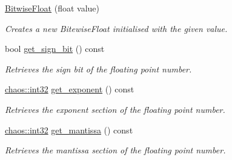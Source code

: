 \begin{DoxyCompactItemize}
\item 
\hypertarget{unionchaos_1_1data_1_1_bitwise_float_a7713ceaaa7cf2a487304088003d94135}{\hyperlink{unionchaos_1_1data_1_1_bitwise_float_a7713ceaaa7cf2a487304088003d94135}{Bitwise\-Float} (float value)}\label{unionchaos_1_1data_1_1_bitwise_float_a7713ceaaa7cf2a487304088003d94135}

\begin{DoxyCompactList}\small\item\em Creates a new Bitewise\-Float initialised with the given value. \end{DoxyCompactList}\item 
\hypertarget{unionchaos_1_1data_1_1_bitwise_float_aec1ad0a94dcf984131cc528b574c7d2d}{bool \hyperlink{unionchaos_1_1data_1_1_bitwise_float_aec1ad0a94dcf984131cc528b574c7d2d}{get\-\_\-sign\-\_\-bit} () const }\label{unionchaos_1_1data_1_1_bitwise_float_aec1ad0a94dcf984131cc528b574c7d2d}

\begin{DoxyCompactList}\small\item\em Retrieves the sign bit of the floating point number. \end{DoxyCompactList}\item 
\hypertarget{unionchaos_1_1data_1_1_bitwise_float_a2ba081eec75c0046f11de70fa08263e3}{\hyperlink{namespacechaos_aba819cd899114dc5873e32e7b26411c4}{chaos\-::int32} \hyperlink{unionchaos_1_1data_1_1_bitwise_float_a2ba081eec75c0046f11de70fa08263e3}{get\-\_\-exponent} () const }\label{unionchaos_1_1data_1_1_bitwise_float_a2ba081eec75c0046f11de70fa08263e3}

\begin{DoxyCompactList}\small\item\em Retrieves the exponent section of the floating point number. \end{DoxyCompactList}\item 
\hypertarget{unionchaos_1_1data_1_1_bitwise_float_a5de1db534ca075097f3796e215485d9a}{\hyperlink{namespacechaos_aba819cd899114dc5873e32e7b26411c4}{chaos\-::int32} \hyperlink{unionchaos_1_1data_1_1_bitwise_float_a5de1db534ca075097f3796e215485d9a}{get\-\_\-mantissa} () const }\label{unionchaos_1_1data_1_1_bitwise_float_a5de1db534ca075097f3796e215485d9a}

\begin{DoxyCompactList}\small\item\em Retrieves the mantissa section of the floating point number. \end{DoxyCompactList}\end{DoxyCompactItemize}
